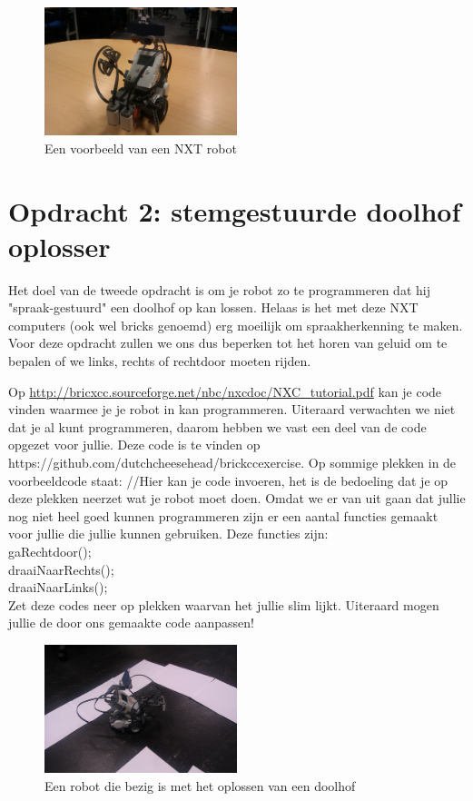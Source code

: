 \documentclass[11pt]{article} %
\begin{document}
\begin{figure}[h!]
	\caption{Een voorbeeld van een NXT robot}
	\centering
	\includegraphics[width=0.5\textwidth]{images/pirate}
\end{figure}

\section*{Opdracht 2: stemgestuurde doolhof oplosser}
Het doel van de tweede opdracht is om je robot zo te programmeren dat hij "spraak-gestuurd" een doolhof op kan lossen. 
Helaas is het met deze NXT computers (ook wel bricks genoemd) erg moeilijk om spraakherkenning te maken. 
Voor deze opdracht zullen we ons dus beperken tot het horen van geluid om te bepalen of we links, rechts of rechtdoor moeten rijden. 

Op \url{http://bricxcc.sourceforge.net/nbc/nxcdoc/NXC_tutorial.pdf} kan je code vinden waarmee je je robot in kan programmeren. 
Uiteraard verwachten we niet dat je al kunt programmeren, daarom hebben we vast een deel van de code opgezet voor jullie. 
Deze code is te vinden op https://github.com/dutchcheesehead/brickccexercise.
Op sommige plekken in de voorbeeldcode staat: //Hier kan je code invoeren, het is de bedoeling dat je op deze plekken neerzet wat je robot moet doen. 
Omdat we er van uit gaan dat jullie nog niet heel goed kunnen programmeren zijn er een aantal functies gemaakt voor jullie die jullie kunnen gebruiken.
Deze functies zijn: \\
gaRechtdoor();\\
draaiNaarRechts();\\
draaiNaarLinks();\\
Zet deze codes neer op plekken waarvan het jullie slim lijkt. 
Uiteraard mogen jullie de door ons gemaakte code aanpassen!


\begin{figure}[h!]
	\caption{Een robot die bezig is met het oplossen van een doolhof}
	\centering
	\includegraphics[width=0.5\textwidth]{images/maze}
\end{figure}
\end{document}
